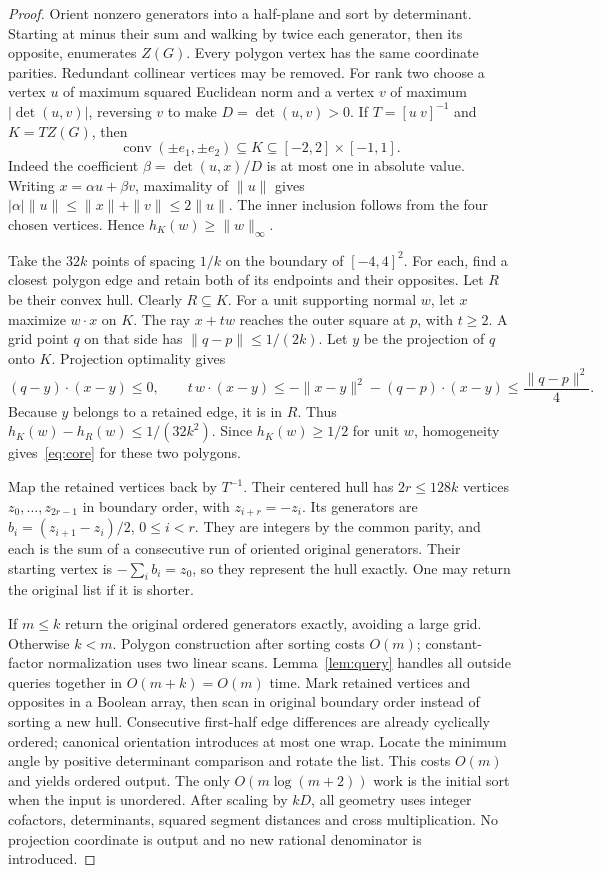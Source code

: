 \documentclass[11pt]{article}
\begin{document}
\begin{proof}
Orient nonzero generators into a half-plane and sort by determinant. Starting
at minus their sum and walking by twice each generator, then its opposite,
enumerates $Z(G)$. Every polygon vertex has the same coordinate parities.
Redundant collinear vertices may be removed. For rank two choose a vertex $u$
of maximum squared Euclidean norm and a vertex $v$ of maximum
$|\det(u,v)|$, reversing $v$ to make $D=\det(u,v)>0$. If
$T=[u\ v]^{-1}$ and $K=TZ(G)$, then
\begin{equation}\label{eq:normalization}
 \operatorname{conv}(\pm e_1,\pm e_2)\subseteq K
 \subseteq[-2,2]\times[-1,1].
\end{equation}
Indeed the coefficient $\beta=\det(u,x)/D$ is at most one in absolute
value. Writing $x=\alpha u+\beta v$, maximality of $\|u\|$ gives
$|\alpha|\|u\|\leq\|x\|+\|v\|\leq2\|u\|$. The inner inclusion follows
from the four chosen vertices. Hence $h_K(w)\geq\|w\|_\infty$.

Take the $32k$ points of spacing $1/k$ on the boundary of $[-4,4]^2$.
For each, find a closest polygon edge and retain both of its endpoints and
their opposites. Let $R$ be their convex hull. Clearly $R\subseteq K$.
For a unit supporting normal $w$, let $x$ maximize $w\cdot x$ on $K$.
The ray $x+tw$ reaches the outer square at $p$, with $t\geq2$.
A grid point $q$ on that side has $\|q-p\|\leq1/(2k)$.
Let $y$ be the projection of $q$ onto $K$. Projection optimality gives
\[
 (q-y)\cdot(x-y)\leq0,\qquad
 t\,w\cdot(x-y)\leq-\|x-y\|^2-(q-p)\cdot(x-y)
 \leq\frac{\|q-p\|^2}{4}.
\]
Because $y$ belongs to a retained edge, it is in $R$. Thus
$h_K(w)-h_R(w)\leq1/(32k^2)$. Since $h_K(w)\geq1/2$ for unit $w$,
homogeneity gives~\eqref{eq:core} for these two polygons.

Map the retained vertices back by $T^{-1}$. Their centered hull has
$2r\leq128k$ vertices $z_0,\ldots,z_{2r-1}$ in boundary order, with
$z_{i+r}=-z_i$. Its generators are
$b_i=(z_{i+1}-z_i)/2$, $0\leq i<r$. They are integers by the common parity,
and each is the sum of a consecutive run of oriented original generators.
Their starting vertex is $-\sum_i b_i=z_0$, so they represent the hull
exactly. One may return the original list if it is shorter.

If $m\leq k$ return the original ordered generators exactly, avoiding a large
grid. Otherwise $k<m$. Polygon construction after sorting costs $O(m)$;
constant-factor normalization uses two linear scans. Lemma~\ref{lem:query}
handles all outside queries together in $O(m+k)=O(m)$ time. Mark retained
vertices and opposites in a Boolean array, then scan in original boundary
order instead of sorting a new hull. Consecutive first-half edge differences
are already cyclically ordered; canonical orientation introduces at most
one wrap. Locate the minimum angle by positive determinant comparison and
rotate the list. This costs $O(m)$ and yields ordered output. The only
$O(m\log(m+2))$ work is the initial sort when the input is unordered.
After scaling by $kD$, all geometry uses integer cofactors, determinants,
squared segment distances and cross multiplication. No projection coordinate
is output and no new rational denominator is introduced.
\end{proof}
\end{document}

